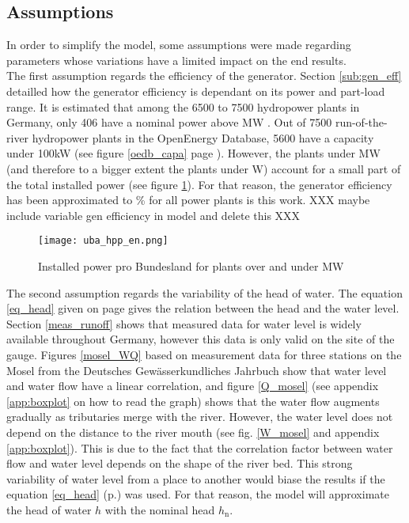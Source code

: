 \subsection{Assumptions}
\label{sub:assumptions}
In order to simplify the model, some assumptions were made regarding parameters whose variations have a limited impact on the end results. \\
The first assumption regards the efficiency of the generator. Section \ref{sub:gen_eff} detailled how the generator efficiency is dependant on its power and part-load range. It is estimated that among the 6500 to 7500 hydropower plants in Germany, only 406 have a nominal power above \unit[1]{MW} \cite{uba_wasserkraft}. Out of 7500 run-of-the-river hydropower plants in the OpenEnergy Database, 5600 have a capacity under 100kW (see figure \ref{oedb_capa} page \pageref{hpp_register}). However, the plants under \unit[1]{MW} (and therefore to a bigger extent the plants under \unit[100k]{W}) account for a small part of the total installed power (see figure \ref{uba_hpp}). For that reason, the generator efficiency has been approximated to \unit[95]{\%} for all power plants is this work. XXX maybe include variable gen efficiency in model and delete this XXX

\begin{figure}[H]
\centering
\texttt{[image: uba\_hpp\_en.png]}
\caption[Installed power pro Bundesland for plants over and under {\unit[1]{MW}}]{Installed power pro Bundesland for plants over and under {\unit[1]{MW}} \cite{uba_wasserkraft}}
\label{uba_hpp}
\end{figure}

The second assumption regards the variability of the head of water. The equation \ref{eq_head} given on page \pageref{eq_head} gives the relation between the head and the water level. Section \ref{meas_runoff} shows that measured data for water level is widely available throughout Germany, however this data is only valid on the site of the gauge. Figures \ref{mosel_WQ} based on measurement data for three stations on the Mosel from the Deutsches Gewässerkundliches Jahrbuch show that water level and water flow have a linear correlation, and figure \ref{Q_mosel} (see appendix \ref{app:boxplot} on how to read the graph) shows that the water flow augments gradually as tributaries merge with the river. However, the water level does not depend on the distance to the river mouth (see fig. \ref{W_mosel} and appendix \ref{app:boxplot}). This is due to the fact that the correlation factor between water flow and water level depends on the shape of the river bed. This strong variability of water level from a place to another would biase the results if the equation \ref{eq_head} (p.\pageref{eq_head}) was used. For that reason, the model will approximate the head of water $h$ with the nominal head $h_\mathrm{n}$.

